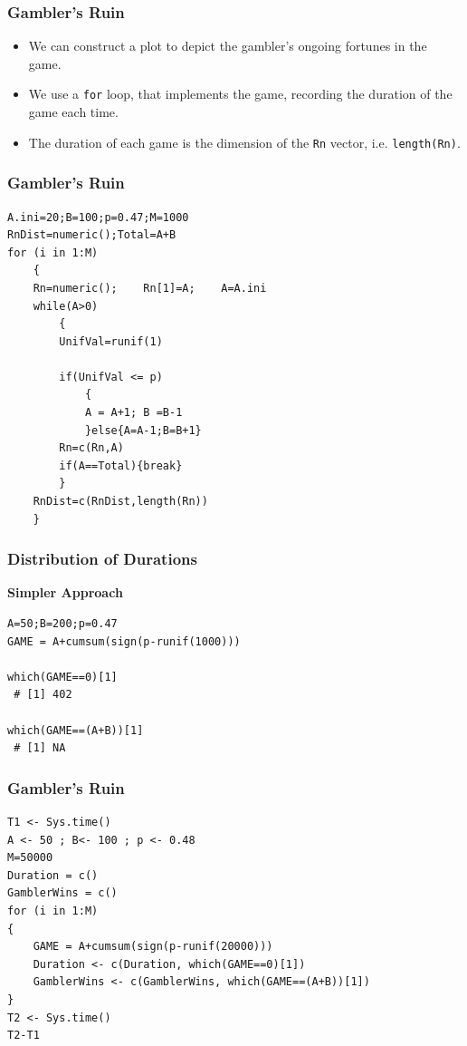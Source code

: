 \documentclass[MAIN.tex]{subfiles}
\begin{document}
\begin{frame}
	\frametitle{Gambler's Ruin}
\begin{itemize}
\item We can construct a plot to depict the gambler's ongoing fortunes in the game. 
\item We use a \texttt{for} loop, that implements the game, recording the duration of the game each time. 
\item The duration of each game is the dimension of the \texttt{Rn} vector, i.e. \texttt{length(Rn)}.
\end{itemize}


\end{frame}
\begin{frame}[fragile]
	\frametitle{Gambler's Ruin}
\begin{framed}
\begin{verbatim}
A.ini=20;B=100;p=0.47;M=1000
RnDist=numeric();Total=A+B
for (i in 1:M)
    {
    Rn=numeric();    Rn[1]=A;    A=A.ini
    while(A>0)
        {
        UnifVal=runif(1)

        if(UnifVal <= p)
            {
            A = A+1; B =B-1
            }else{A=A-1;B=B+1}
        Rn=c(Rn,A)
        if(A==Total){break}
        }
    RnDist=c(RnDist,length(Rn))
    }
\end{verbatim}
\end{framed}
\end{frame}
\begin{frame}[fragile]
\frametitle{Distribution of Durations}
\textbf{Simpler Approach}
\begin{framed}
\begin{verbatim}
A=50;B=200;p=0.47
GAME = A+cumsum(sign(p-runif(1000)))

which(GAME==0)[1]
 # [1] 402

which(GAME==(A+B))[1]
 # [1] NA
\end{verbatim}
\end{framed}

\end{frame}
\begin{frame}[fragile]
	\frametitle{Gambler's Ruin}
\begin{framed}
	\begin{verbatim}
T1 <- Sys.time()
A <- 50 ; B<- 100 ; p <- 0.48
M=50000
Duration = c()
GamblerWins = c()
for (i in 1:M)
{
	GAME = A+cumsum(sign(p-runif(20000)))
	Duration <- c(Duration, which(GAME==0)[1])
	GamblerWins <- c(GamblerWins, which(GAME==(A+B))[1])
}
T2 <- Sys.time()
T2-T1
\end{verbatim}
\end{framed}
\end{frame}
\end{document}
